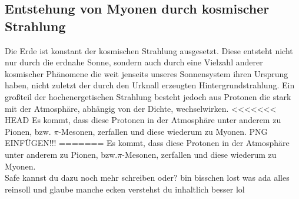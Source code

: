 \subsection{Entstehung von Myonen durch kosmischer Strahlung}
Die Erde ist konstant der kosmischen Strahlung ausgesetzt. Diese entsteht nicht nur durch die erdnahe Sonne, sondern auch durch eine Vielzahl anderer kosmischer Phänomene die weit jenseits unseres Sonnensystem ihren Ursprung haben, nicht zuletzt der
durch den Urknall erzeugten Hintergrundstrahlung. Ein großteil der hochenergetischen Strahlung besteht jedoch aus Protonen die stark mit der Atmosphäre, abhängig von der Dichte, wechselwirken.
<<<<<<< HEAD
Es kommt, dass diese Protonen in der Atmosphäre unter anderem zu Pionen, bzw. $\pi$-Mesonen, zerfallen und diese wiederum zu Myonen. 
%
PNG EINFÜGEN!!!
=======
Es kommt, dass diese Protonen in der Atmosphäre unter anderem zu Pionen, bzw.$\pi$-Mesonen, zerfallen und diese wiederum zu Myonen. 
\\
\newline
Safe kannst du dazu noch mehr schreiben oder? bin bisschen lost was ada alles reinsoll und glaube manche ecken verstehst du inhaltlich besser lol

